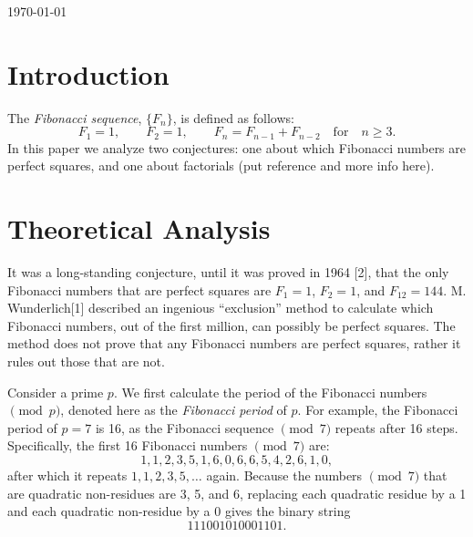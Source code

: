 \documentclass[11pt]{article}
\begin{document}
\begin{titlepage}
{\large \today}\\[3cm] 


 

\vfill 

\end{titlepage}

\tableofcontents
\newpage
\newpage

\section{Introduction}

The \textit{Fibonacci sequence}, $\{F_n\}$, is defined as follows: \[ F_1 = 1, \qquad F_2 = 1, \qquad F_n = F_{n - 1} + F_{n - 2} \quad \text{for} \quad n \geq 3. \] In this paper we analyze two conjectures: one about which Fibonacci numbers are perfect squares, and one about factorials (put reference and more info here).

\section{Theoretical Analysis}

It was a long-standing conjecture, until it was proved in 1964 [2], that the only Fibonacci numbers that are perfect squares are $F_1 = 1$, $F_2 = 1$, and $F_12 = 144$. M. Wunderlich[1] described an ingenious ``exclusion'' method to calculate which Fibonacci numbers, out of the first million, can possibly be perfect squares. The method does not prove that any Fibonacci numbers are perfect squares, rather it rules out those that are not.

Consider a prime $p$. We first calculate the period of the Fibonacci numbers $\pmod p$, denoted here as the \textit{Fibonacci period} of $p$. For example, the Fibonacci period of $p = 7$ is 16, as the Fibonacci sequence $\pmod 7$ repeats after 16 steps. Specifically, the first 16 Fibonacci numbers $\pmod{7}$ are: \[ 1, 1, 2, 3, 5, 1, 6, 0, 6, 6, 5, 4, 2, 6, 1, 0, \] after which it repeats $1, 1, 2, 3, 5, \dots$ again. Because the numbers $\pmod{7}$ that are quadratic non-residues are 3, 5, and 6, replacing each quadratic residue by a 1 and each quadratic non-residue by a 0 gives the binary string \[111001010001101.\]
\end{document}
